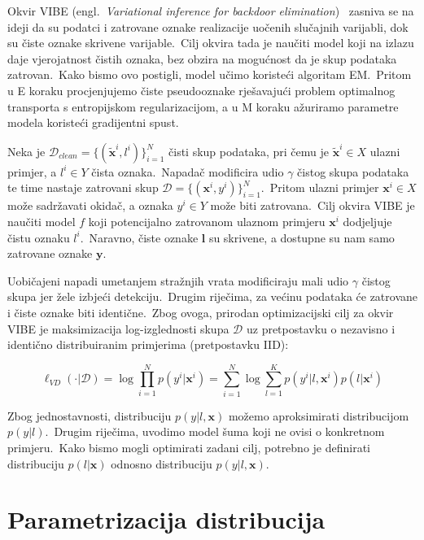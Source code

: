 \documentclass[diplomskirad]{fer}
\begin{document}
Okvir VIBE (engl.\ \textit{Variational inference for backdoor elimination})~\cite{sabolic2025seal} zasniva se na ideji da su podatci i zatrovane oznake realizacije uočenih slučajnih varijabli, dok su čiste oznake skrivene varijable.\ 
Cilj okvira tada je naučiti model koji na izlazu daje vjerojatnost čistih oznaka, bez obzira na mogućnost da je skup podataka zatrovan.\ Kako bismo ovo postigli, model učimo koristeći algoritam EM.\ 
Pritom u E koraku procjenjujemo čiste pseudooznake rješavajući problem optimalnog transporta s entropijskom regularizacijom, a u M koraku ažuriramo parametre modela koristeći gradijentni spust.\ 

Neka je $\mathcal{D}_{clean} = \{(\bm{\tilde{x}}^i, l^i)\}_{i=1}^{N}$ čisti skup podataka, pri čemu je $\bm{\tilde{x}}^i \in X$ ulazni primjer, a $l^i \in Y$ čista oznaka.\ 
Napadač modificira udio $\gamma$ čistog skupa podataka te time nastaje zatrovani skup $\mathcal{D} = \{(\bm{x}^i, y^i)\}_{i=1}^{N}$.\ Pritom ulazni primjer $\bm{x}^i \in X$ može sadržavati okidač, a oznaka $y^i \in Y$ može biti zatrovana.\ 
Cilj okvira VIBE je naučiti model $f$ koji potencijalno zatrovanom ulaznom primjeru $\bm{x}^i$ dodjeljuje čistu oznaku $l^i$.\ 
Naravno, čiste oznake $\bm{l}$ su skrivene, a dostupne su nam samo zatrovane oznake $\bm{y}$.\ 

Uobičajeni napadi umetanjem stražnjih vrata modificiraju mali udio $\gamma$ čistog skupa jer žele izbjeći detekciju.\ Drugim riječima, za većinu podataka će zatrovane i čiste oznake biti identične.\
Zbog ovoga, prirodan optimizacijski cilj za okvir VIBE je maksimizacija log-izglednosti skupa $\mathcal{D}$ uz pretpostavku o nezavisno i identično distribuiranim primjerima (pretpostavku IID):

\begin{equation}
  \ell_{VD}(\cdot|\mathcal{D}) = \log \prod_{i=1}^{N} p(y^i | \bm{x}^i) = \sum_{i=1}^{N} \log \sum_{l=1}^{K} p(y^i | l, \bm{x}^i) p(l | \bm{x}^i)
  \label{eq:vibe_initial}
\end{equation}

\pagebreak

Zbog jednostavnosti, distribuciju $p(y | l, \bm{x})$ možemo aproksimirati distribucijom $p(y | l)$.\ Drugim riječima, uvodimo model šuma koji ne ovisi o konkretnom primjeru.\ 
Kako bismo mogli optimirati zadani cilj, potrebno je definirati distribuciju $p(l | \bm{x})$ odnosno distribuciju $p(y | l, \bm{x})$.\

\section{Parametrizacija distribucija}
\label{sek:param}
\end{document}
